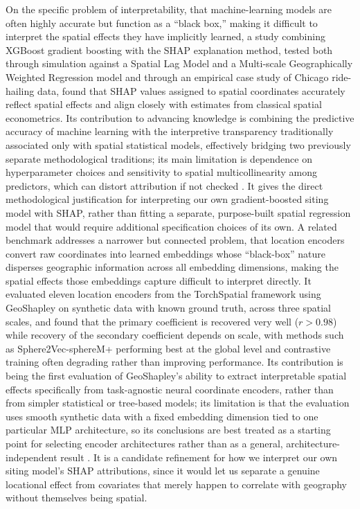 \documentclass[journal]{IEEEtran}
\begin{document}
On the specific problem of interpretability, that machine-learning models are often highly accurate but function as a ``black box,'' making it difficult to interpret the spatial effects they have implicitly learned, a study combining XGBoost gradient boosting with the SHAP explanation method, tested both through simulation against a Spatial Lag Model and a Multi-scale Geographically Weighted Regression model and through an empirical case study of Chicago ride-hailing data, found that SHAP values assigned to spatial coordinates accurately reflect spatial effects and align closely with estimates from classical spatial econometrics. Its contribution to advancing knowledge is combining the predictive accuracy of machine learning with the interpretive transparency traditionally associated only with spatial statistical models, effectively bridging two previously separate methodological traditions; its main limitation is dependence on hyperparameter choices and sensitivity to spatial multicollinearity among predictors, which can distort attribution if not checked \cite{li2022extracting}. It gives the direct methodological justification for interpreting our own gradient-boosted siting model with SHAP, rather than fitting a separate, purpose-built spatial regression model that would require additional specification choices of its own. A related benchmark addresses a narrower but connected problem, that location encoders convert raw coordinates into learned embeddings whose ``black-box'' nature disperses geographic information across all embedding dimensions, making the spatial effects those embeddings capture difficult to interpret directly. It evaluated eleven location encoders from the TorchSpatial framework using GeoShapley on synthetic data with known ground truth, across three spatial scales, and found that the primary coefficient is recovered very well ($r > 0.98$) while recovery of the secondary coefficient depends on scale, with methods such as Sphere2Vec-sphereM+ performing best at the global level and contrastive training often degrading rather than improving performance. Its contribution is being the first evaluation of GeoShapley's ability to extract interpretable spatial effects specifically from task-agnostic neural coordinate encoders, rather than from simpler statistical or tree-based models; its limitation is that the evaluation uses smooth synthetic data with a fixed embedding dimension tied to one particular MLP architecture, so its conclusions are best treated as a starting point for selecting encoder architectures rather than as a general, architecture-independent result \cite{li2024geoshapley}. It is a candidate refinement for how we interpret our own siting model's SHAP attributions, since it would let us separate a genuine locational effect from covariates that merely happen to correlate with geography without themselves being spatial.
\end{document}
